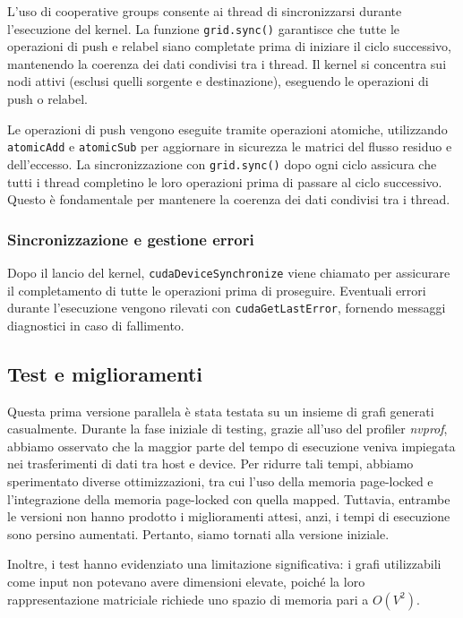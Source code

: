                 L'uso di cooperative groups consente ai thread di sincronizzarsi durante l'esecuzione del kernel. La funzione \verb|grid.sync()| garantisce che tutte le operazioni di push e relabel siano completate prima di iniziare il ciclo successivo, mantenendo la coerenza dei dati condivisi tra i thread. Il kernel si concentra sui nodi attivi (esclusi quelli sorgente e destinazione), eseguendo le operazioni di push o relabel.
            
                Le operazioni di push vengono eseguite tramite operazioni atomiche, utilizzando \verb|atomicAdd| e \verb|atomicSub| per aggiornare in sicurezza le matrici del flusso residuo e dell'eccesso. La sincronizzazione con \verb|grid.sync()| dopo ogni ciclo assicura che tutti i thread completino le loro operazioni prima di passare al ciclo successivo. Questo è fondamentale per mantenere la coerenza dei dati condivisi tra i thread.

            \subsubsection{Sincronizzazione e gestione errori}
                Dopo il lancio del kernel, \verb|cudaDeviceSynchronize| viene chiamato per assicurare il completamento di tutte le operazioni prima di proseguire. Eventuali errori durante l'esecuzione vengono rilevati con \verb|cudaGetLastError|, fornendo messaggi diagnostici in caso di fallimento.


        \subsection{Test e miglioramenti}

            Questa prima versione parallela è stata testata su un insieme di grafi generati casualmente. Durante la fase iniziale di testing, grazie all'uso del profiler \textit{nvprof}, abbiamo osservato che la maggior parte del tempo di esecuzione veniva impiegata nei trasferimenti di dati tra host e device. Per ridurre tali tempi, abbiamo sperimentato diverse ottimizzazioni, tra cui l'uso della memoria page-locked e l'integrazione della memoria page-locked con quella mapped. Tuttavia, entrambe le versioni non hanno prodotto i miglioramenti attesi, anzi, i tempi di esecuzione sono persino aumentati. Pertanto, siamo tornati alla versione iniziale.

            Inoltre, i test hanno evidenziato una limitazione significativa: i grafi utilizzabili come input non potevano avere dimensioni elevate, poiché la loro rappresentazione matriciale richiede uno spazio di memoria pari a $O(V^2)$.

